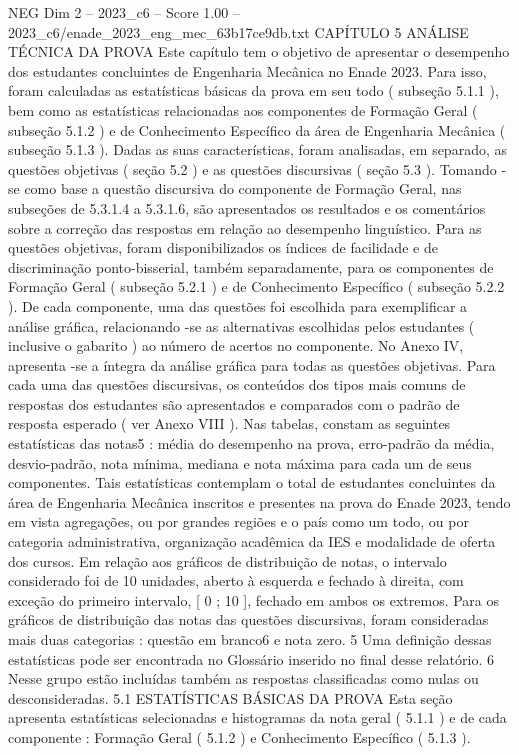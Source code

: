\begin{textsample}{NEG Dim 2 – 2023\_c6 – Score 1.00 – 2023\_c6/enade\_2023\_eng\_mec\_63b17ce9db.txt}  \label{ex:f2_neg_265}
CAPÍTULO 5 ANÁLISE TÉCNICA DA PROVA Este capítulo tem o objetivo de apresentar o desempenho dos estudantes concluintes de Engenharia Mecânica no Enade 2023.
Para isso, foram calculadas as estatísticas básicas da prova em seu todo ( subseção 5.1.1 ), bem como as estatísticas relacionadas aos componentes de Formação Geral ( subseção 5.1.2 ) e de Conhecimento Específico da área de Engenharia Mecânica ( subseção 5.1.3 ).
Dadas as suas características, foram analisadas, em separado, as questões objetivas ( seção 5.2 ) e as questões discursivas ( seção 5.3 ).
Tomando -se como base a questão discursiva do componente de Formação Geral, nas subseções de 5.3.1.4 a 5.3.1.6, são apresentados os resultados e os comentários sobre a correção das respostas em relação ao desempenho linguístico.
Para as questões objetivas, foram disponibilizados os índices de facilidade e de discriminação ponto-bisserial, também separadamente, para os componentes de Formação Geral ( subseção 5.2.1 ) e de Conhecimento Específico ( subseção 5.2.2 ).
De cada componente, uma das questões foi escolhida para exemplificar a análise gráfica, relacionando -se as alternativas escolhidas pelos estudantes ( inclusive o gabarito ) ao número de acertos no componente.
No Anexo IV, apresenta -se a íntegra da análise gráfica para todas as questões objetivas.
Para cada uma das questões discursivas, os conteúdos dos tipos mais comuns de respostas dos estudantes são apresentados e comparados com o padrão de resposta esperado ( ver Anexo VIII ).
Nas tabelas, constam as seguintes estatísticas das notas5 : média do desempenho na prova, erro-padrão da média, desvio-padrão, nota mínima, mediana e nota máxima para cada um de seus componentes.
Tais estatísticas contemplam o total de estudantes concluintes da área de Engenharia Mecânica inscritos e presentes na prova do Enade 2023, tendo em vista agregações, ou por grandes regiões e o país como um todo, ou por categoria administrativa, organização acadêmica da IES e modalidade de oferta dos cursos.
Em relação aos gráficos de distribuição de notas, o intervalo considerado foi de 10 unidades, aberto à esquerda e fechado à direita, com exceção do primeiro intervalo, [ 0 ; 10 ], fechado em ambos os extremos.
Para os gráficos de distribuição das notas das questões discursivas, foram consideradas mais duas categorias : questão em branco6 e nota zero. 5 Uma definição dessas estatísticas pode ser encontrada no Glossário inserido no final desse relatório. 6 Nesse grupo estão incluídas também as respostas classificadas como nulas ou desconsideradas. 5.1 ESTATÍSTICAS BÁSICAS DA PROVA Esta seção apresenta estatísticas selecionadas e histogramas da nota geral ( 5.1.1 ) e de cada componente : Formação Geral ( 5.1.2 ) e Conhecimento Específico ( 5.1.3 ).

\end{textsample}
